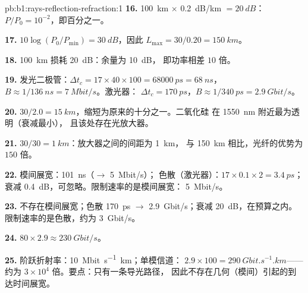 \begin{solution}{pb:b1:rays-reflection-refraction:1}
\textbf{16.} \qty{100}{km} $\times$ \qty{0.2}{dB/km} $= \qty{20}{dB}$：
$P/P_0 = 10^{-2}$，即百分之一。

\textbf{17.} $10\log(P_0/P_{\min}) = \qty{30}{dB}$，因此 $L_{\max} =
30/0.20 = \qty{150}{km}$。

\textbf{18.} \qty{100}{km} 损耗 \qty{20}{dB}：余量为 \qty{10}{dB}，
即功率相差 $10$ 倍。

\textbf{19.} 发光二极管：$\Delta t_c = 17 \times 40 \times 100 = \qty{68000}{ps}
= \qty{68}{ns}$，$B \approx 1/\qty{136}{ns} = \qty{7}{Mbit/s}$。激光器：
$\Delta t_c = \qty{170}{ps}$，$B \approx 1/\qty{340}{ps} =
\qty{2.9}{Gbit/s}$。

\textbf{20.} $30/2.0 = \qty{15}{km}$，缩短为原来的十分之一。二氧化硅
在 \qty{1550}{nm} 附近最为透明（衰减最小），
且该处存在光放大器。

\textbf{21.} $30/30 = \qty{1}{km}$：放大器之间的间距为 \qty{1}{km}，
与 \qty{150}{km} 相比，光纤的优势为 $150$ 倍。

\textbf{22.} 模间展宽：\qty{101}{ns}（$\to$ \qty{5}{Mbit/s}）；
色散（激光器）：$17 \times 0.1 \times 2 = \qty{3.4}{ps}$；
衰减 \qty{0.4}{dB}，可忽略。限制速率的是模间展宽：
\qty{5}{Mbit/s}。

\textbf{23.} 不存在模间展宽；色散 \qty{170}{ps} $\to$
\qty{2.9}{Gbit/s}；衰减 \qty{20}{dB}，在预算之内。
限制速率的是色散，约为 \qty{3}{Gbit/s}。

\textbf{24.} $80 \times 2.9 \approx \qty{230}{Gbit/s}$。

\textbf{25.} 阶跃折射率：\qty{10}{Mbit.s^{-1}.km}；单模信道：
$2.9 \times 100 = \qty{290}{Gbit.s^{-1}.km}$——约为
$3\times10^4$ 倍。要点：只有一条导光路径，
因此不存在几何（模间）引起的到达时间展宽。
\end{solution}
